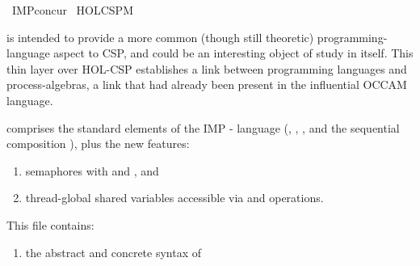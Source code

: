 %
\begin{isabellebody}%
%
%
\isadelimdocument
%
\endisadelimdocument
%
\isatagdocument
%
\isamarkuptrue%
%
\endisatagdocument
{\isafolddocument}%
%
\isadelimdocument
%
\endisadelimdocument
%
\isadelimtheory
%
\endisadelimtheory
%
\isatagtheory
{}\isamarkupfalse%
\ IMP{\isacharunderscore}{\kern0pt}concur\isanewline
{}\ {\isachardoublequoteopen}HOL{\isacharminus}{\kern0pt}CSPM{\isachardoublequoteclose}\ \ \isanewline
\isanewline
{}%
\endisatagtheory
{\isafoldtheory}%
%
\isadelimtheory
%
\endisadelimtheory
%
\isadelimdocument
%
\endisadelimdocument
%
\isatagdocument
%
\isamarkuptrue%
%
\endisatagdocument
{\isafolddocument}%
%
\isadelimdocument
%
\endisadelimdocument
%
\begin{isamarkuptext}%
 is intended to provide a more common (though still theoretic)
programming-language aspect to CSP, and could be an interesting object
of study in itself. This thin layer over HOL-CSP establishes a link 
between programming languages and process-algebras, a link that had already
been present in the influential OCCAM language.

 comprises the standard elements of the IMP - language (, ,
,  and the sequential composition \isa{{\isacharunderscore}{\kern0pt}\ {\isacharsemicolon}{\kern0pt}\ {\isacharunderscore}{\kern0pt}}), plus 
the new features:

%
\begin{enumerate}%
\item semaphores with  and , and

\item thread-global shared variables accessible 
via  and  operations.%
\end{enumerate}

This file contains:

%
\begin{enumerate}%
\item the abstract and concrete syntax of 


\end{enumerate}
\end{isamarkuptext}
\end{isabellebody}
